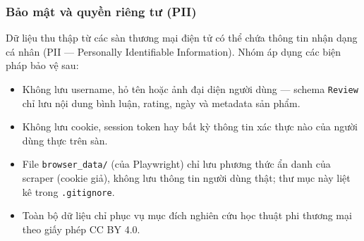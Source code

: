 \subsubsection{Bảo mật và quyền riêng tư (PII)}

Dữ liệu thu thập từ các sàn thương mại điện tử có thể chứa thông tin nhận dạng cá nhân (PII --- Personally Identifiable Information). Nhóm áp dụng các biện pháp bảo vệ sau:

\begin{itemize}[labelsep=10pt, leftmargin=2cm]
    \item Không lưu username, hỏ tên hoặc ảnh đại diện người dùng --- schema \texttt{Review} chỉ lưu nội dung bình luận, rating, ngày và metadata sản phẩm.
    \item Không lưu cookie, session token hay bất kỳ thông tin xác thực nào của người dùng thực trên sàn.
    \item File \texttt{browser\_data/} (của Playwright) chỉ lưu phương thức ẩn danh của scraper (cookie giả), không lưu thông tin người dùng thật; thư mục này liệt kê trong \texttt{.gitignore}.
    \item Toàn bộ dữ liệu chỉ phục vụ mục đích nghiên cứu học thuật phi thương mại theo giấy phép CC BY 4.0.
\end{itemize}

\clearpage
